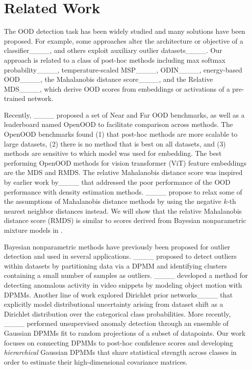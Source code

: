 \section{Related Work}
\label{sec:relatedwork}
The OOD detection task has been widely studied and many solutions have been proposed.
For example, some approaches alter the architecture or objective of a classifier____, and others exploit auxiliary outlier datasets____.
Our approach is related to a class of post-hoc methods including max softmax probability____, temperature-scaled MSP____, ODIN____, energy-based OOD____, the Mahalanobis distance score____, and the Relative MDS____, which derive OOD scores from embeddings or activations of a pre-trained network.

Recently, ____ proposed a set of Near and Far OOD benchmarks, as well as a leaderboard named OpenOOD to facilitate comparison across methods. The OpenOOD benchmarks found (1) that post-hoc methods are more scalable to large datasets, (2) there is no method that is best on all datasets, and (3) methods are sensitive to which model was used for embedding.
The best performing OpenOOD methods for vision transformer (ViT) feature embeddings are the MDS and RMDS.
The relative Mahalanobis distance score was inspired by earlier work by____ that addressed the poor performance of the OOD performance with density estimation methods.
____ propose to relax some of the assumptions of Mahalanobis distance methods by using the negative $k$-th nearest neighbor distances instead.
We will show that the relative Mahalanobis distance score (RMDS) is similar to scores derived from Bayesian nonparametric mixture models in .

Bayesian nonparametric methods have previously been proposed for outlier detection and used in several applications. ____ proposed to detect outliers within datasets by partitioning data via a DPMM and identifying clusters containing a small number of samples as outliers.
____ developed a method for detecting anomalous activity in video snippets by modeling object motion with DPMMs. Another line of work explored Dirichlet prior networks____ that explicitly model distributional uncertainty arising from dataset shift as a Dirichlet distribution over the categorical class probabilities.
More recently, ____ performed unsupervised anomaly detection through an ensemble of Gaussian DPMMs fit to random projections of a subset of datapoints.
Our work focuses on connecting DPMMs to post-hoc confidence scores and developing \textit{hierarchical} Gaussian DPMMs that share statistical strength across classes in order to estimate their high-dimensional covariance matrices.